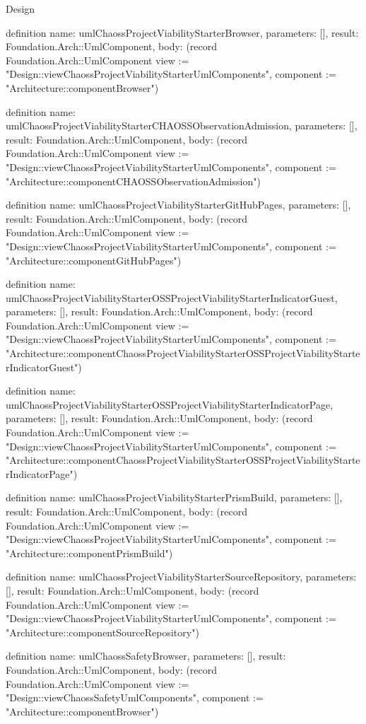 \begin{lexlean}{Design}
\begin{semanticmodule}
definition{
  name: umlChaossProjectViabilityStarterBrowser,
  parameters: [],
  result: Foundation.Arch::UmlComponent,
  body: (record Foundation.Arch::UmlComponent {view := "Design::viewChaossProjectViabilityStarterUmlComponents", component := "Architecture::componentBrowser"})
}

definition{
  name: umlChaossProjectViabilityStarterCHAOSSObservationAdmission,
  parameters: [],
  result: Foundation.Arch::UmlComponent,
  body: (record Foundation.Arch::UmlComponent {view := "Design::viewChaossProjectViabilityStarterUmlComponents", component := "Architecture::componentCHAOSSObservationAdmission"})
}

definition{
  name: umlChaossProjectViabilityStarterGitHubPages,
  parameters: [],
  result: Foundation.Arch::UmlComponent,
  body: (record Foundation.Arch::UmlComponent {view := "Design::viewChaossProjectViabilityStarterUmlComponents", component := "Architecture::componentGitHubPages"})
}

definition{
  name: umlChaossProjectViabilityStarterOSSProjectViabilityStarterIndicatorGuest,
  parameters: [],
  result: Foundation.Arch::UmlComponent,
  body: (record Foundation.Arch::UmlComponent {view := "Design::viewChaossProjectViabilityStarterUmlComponents", component := "Architecture::componentChaossProjectViabilityStarterOSSProjectViabilityStarterIndicatorGuest"})
}

definition{
  name: umlChaossProjectViabilityStarterOSSProjectViabilityStarterIndicatorPage,
  parameters: [],
  result: Foundation.Arch::UmlComponent,
  body: (record Foundation.Arch::UmlComponent {view := "Design::viewChaossProjectViabilityStarterUmlComponents", component := "Architecture::componentChaossProjectViabilityStarterOSSProjectViabilityStarterIndicatorPage"})
}

definition{
  name: umlChaossProjectViabilityStarterPrismBuild,
  parameters: [],
  result: Foundation.Arch::UmlComponent,
  body: (record Foundation.Arch::UmlComponent {view := "Design::viewChaossProjectViabilityStarterUmlComponents", component := "Architecture::componentPrismBuild"})
}

definition{
  name: umlChaossProjectViabilityStarterSourceRepository,
  parameters: [],
  result: Foundation.Arch::UmlComponent,
  body: (record Foundation.Arch::UmlComponent {view := "Design::viewChaossProjectViabilityStarterUmlComponents", component := "Architecture::componentSourceRepository"})
}

definition{
  name: umlChaossSafetyBrowser,
  parameters: [],
  result: Foundation.Arch::UmlComponent,
  body: (record Foundation.Arch::UmlComponent {view := "Design::viewChaossSafetyUmlComponents", component := "Architecture::componentBrowser"})
}


\end{semanticmodule}
\end{lexlean}
